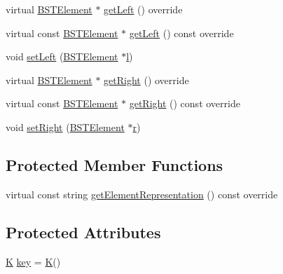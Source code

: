 \begin{DoxyCompactItemize}
\item 
virtual \mbox{\hyperlink{classbridges_1_1_b_s_t_element}{B\+S\+T\+Element}} $\ast$ \mbox{\hyperlink{classbridges_1_1_b_s_t_element_a4d8987373c75b51fca94e3c0b78b87a6}{get\+Left}} () override
\item 
virtual const \mbox{\hyperlink{classbridges_1_1_b_s_t_element}{B\+S\+T\+Element}} $\ast$ \mbox{\hyperlink{classbridges_1_1_b_s_t_element_a2abcfb991f6cc377da2bd9217319fc9c}{get\+Left}} () const override
\item 
void \mbox{\hyperlink{classbridges_1_1_b_s_t_element_a9bb5412bffab516268163ed772eb2c41}{set\+Left}} (\mbox{\hyperlink{classbridges_1_1_b_s_t_element}{B\+S\+T\+Element}} $\ast$\mbox{\hyperlink{namespacebridges_acfb0a4f7877d8f63de3e6862004c50eda2db95e8e1a9267b7a1188556b2013b33}{l}})
\item 
virtual \mbox{\hyperlink{classbridges_1_1_b_s_t_element}{B\+S\+T\+Element}} $\ast$ \mbox{\hyperlink{classbridges_1_1_b_s_t_element_a35e93bce32de933522dccde5f2b5ffd9}{get\+Right}} () override
\item 
virtual const \mbox{\hyperlink{classbridges_1_1_b_s_t_element}{B\+S\+T\+Element}} $\ast$ \mbox{\hyperlink{classbridges_1_1_b_s_t_element_ae4e7b750eada97074a42e7f54b320a29}{get\+Right}} () const override
\item 
void \mbox{\hyperlink{classbridges_1_1_b_s_t_element_a7267de974d13907f953afc78ea4fcd19}{set\+Right}} (\mbox{\hyperlink{classbridges_1_1_b_s_t_element}{B\+S\+T\+Element}} $\ast$\mbox{\hyperlink{namespacebridges_acfb0a4f7877d8f63de3e6862004c50eda4b43b0aee35624cd95b910189b3dc231}{r}})
\end{DoxyCompactItemize}
\subsection*{Protected Member Functions}
\begin{DoxyCompactItemize}
\item 
virtual const string \mbox{\hyperlink{classbridges_1_1_b_s_t_element_a623d1495a0d27090dc3fc515d148f381}{get\+Element\+Representation}} () const override
\end{DoxyCompactItemize}
\subsection*{Protected Attributes}
\begin{DoxyCompactItemize}
\item 
\mbox{\hyperlink{namespacebridges_acfb0a4f7877d8f63de3e6862004c50edaa5f3c6a11b03839d46af9fb43c97c188}{K}} \mbox{\hyperlink{classbridges_1_1_b_s_t_element_aebe8a0958484a0e28e777b423079bae2}{key}} = \mbox{\hyperlink{namespacebridges_acfb0a4f7877d8f63de3e6862004c50edaa5f3c6a11b03839d46af9fb43c97c188}{K}}()
\end{DoxyCompactItemize}

